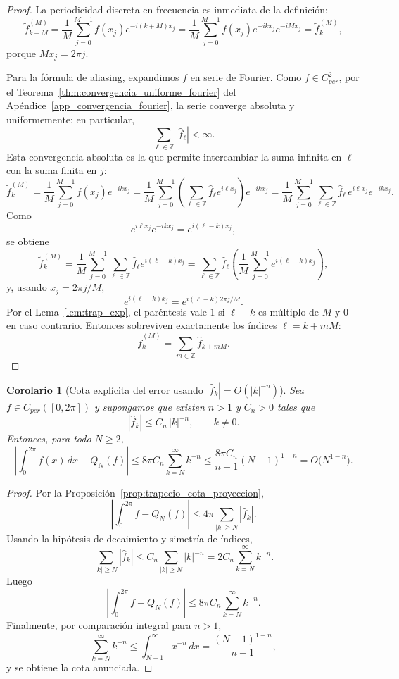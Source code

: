 \documentclass[a4paper,11pt]{report}
\newtheorem{corollary}[theorem]{Corolario}
\begin{document}
\begin{proof}
La periodicidad discreta en frecuencia es inmediata de la definición:
\[
\tilde f_{k+M}^{(M)} = \frac1M\sum_{j=0}^{M-1} f(x_j)e^{-i(k+M)x_j}
= \frac1M\sum_{j=0}^{M-1} f(x_j)e^{-ikx_j}e^{-iMx_j}
=\tilde f_k^{(M)},
\]
porque $Mx_j=2\pi j$.

Para la fórmula de aliasing, expandimos $f$ en serie de Fourier. Como $f\in C^2_{per}$, por el Teorema~\ref{thm:convergencia_uniforme_fourier} del Apéndice~\ref{app_convergencia_fourier}, la serie converge absoluta y uniformemente; en particular,
\[
\sum_{\ell\in\mathbb Z}|\hat f_\ell|<\infty.
\]
Esta convergencia absoluta es la que permite intercambiar la suma infinita en $\ell$ con la suma finita en $j$:
\[
\tilde f_k^{(M)}
=\frac1M\sum_{j=0}^{M-1} f(x_j)e^{-ikx_j}
=\frac1M\sum_{j=0}^{M-1}\left(\sum_{\ell\in\mathbb Z}\hat f_\ell e^{i\ell x_j}\right)e^{-ikx_j}
=\frac1M\sum_{j=0}^{M-1}\sum_{\ell\in\mathbb Z}\hat f_\ell\,e^{i\ell x_j}e^{-ikx_j}.
\]
Como
\[
e^{i\ell x_j}e^{-ikx_j}=e^{i(\ell-k)x_j},
\]
se obtiene
\[
\tilde f_k^{(M)}
=\frac1M\sum_{j=0}^{M-1}\sum_{\ell\in\mathbb Z}\hat f_\ell e^{i(\ell-k)x_j}
=\sum_{\ell\in\mathbb Z}\hat f_\ell\left(\frac1M\sum_{j=0}^{M-1}e^{i(\ell-k)x_j}\right),
\]
y, usando $x_j=2\pi j/M$,
\[
e^{i(\ell-k)x_j}=e^{i(\ell-k)2\pi j/M}.
\]
Por el Lema~\ref{lem:trap_exp}, el paréntesis vale $1$ si $\ell-k$ es múltiplo de $M$ y $0$ en caso contrario. Entonces sobreviven exactamente los índices $\ell=k+mM$:
\[
\tilde f_k^{(M)}=\sum_{m\in\mathbb Z}\hat f_{k+mM}.
\]
\end{proof}



\begin{corollary}[Cota explícita del error usando $|\hat f_k|=O(|k|^{-n})$]\label{cor:trap_cota_cola_fourier}
Sea $f\in C_{per}([0,2\pi])$ y supongamos que existen $n>1$ y $C_n>0$ tales que
\[
|\hat f_k|\le C_n\,|k|^{-n},\qquad k\neq 0.
\]
Entonces, para todo $N\ge 2$,
\[
\left|\int_0^{2\pi} f(x)\,dx-Q_N(f)\right|
\le 8\pi C_n\sum_{k=N}^{\infty}k^{-n}
\le \frac{8\pi C_n}{n-1}(N-1)^{1-n}
=O\big(N^{1-n}\big).
\]
\end{corollary}

\begin{proof}
Por la Proposición~\ref{prop:trapecio_cota_proyeccion},
\[
\left|\int_0^{2\pi} f-Q_N(f)\right|
\le 4\pi\sum_{|k|\ge N}|\hat f_k|.
\]
Usando la hipótesis de decaimiento y simetría de índices,
\[
\sum_{|k|\ge N}|\hat f_k|
\le C_n\sum_{|k|\ge N}|k|^{-n}
=2C_n\sum_{k=N}^{\infty}k^{-n}.
\]
Luego
\[
\left|\int_0^{2\pi} f-Q_N(f)\right|
\le 8\pi C_n\sum_{k=N}^{\infty}k^{-n}.
\]
Finalmente, por comparación integral para $n>1$,
\[
\sum_{k=N}^{\infty}k^{-n}
\le \int_{N-1}^{\infty}x^{-n}\,dx
=\frac{(N-1)^{1-n}}{n-1},
\]
y se obtiene la cota anunciada.\qedhere
\end{proof}
\end{document}

